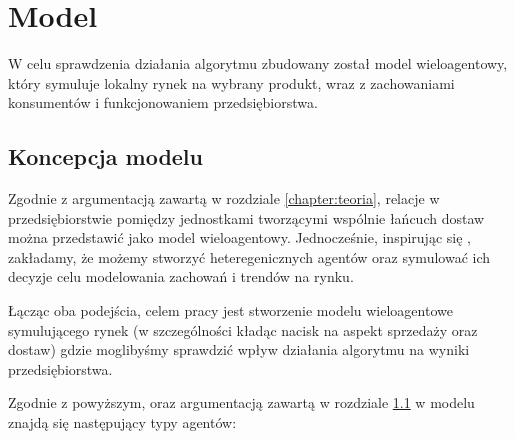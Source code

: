 \documentclass[polish, twoside, 12pt, a4paper]{article}
\theoremstyle{definition}
\theoremstyle{plain}
\theoremstyle{remark}
\begin{document}
\clearpage

\section{Model} \label{chapter:model}

W celu sprawdzenia działania algorytmu zbudowany został model wieloagentowy, który symuluje lokalny rynek na wybrany produkt, wraz z zachowaniami konsumentów i funkcjonowaniem przedsiębiorstwa.

\subsection{Koncepcja modelu} \label{chapter:koncepcja}

Zgodnie z argumentacją zawartą w rozdziale \ref{chapter:teoria}, relacje w przedsiębiorstwie pomiędzy jednostkami tworzącymi wspólnie łańcuch dostaw można przedstawić jako model wieloagentowy. Jednocześnie, inspirując się \cite{Kaminski2012}, zakładamy, że możemy stworzyć heteregenicznych agentów oraz symulować ich decyzje celu modelowania zachowań i trendów na rynku. 

Łącząc oba podejścia, celem pracy jest stworzenie modelu wieloagentowe symulującego rynek (w szczególności kładąc nacisk na aspekt sprzedaży oraz dostaw) gdzie moglibyśmy sprawdzić wpływ działania algorytmu na wyniki przedsiębiorstwa.

Zgodnie z powyższym, oraz argumentacją zawartą w rozdziale \ref{chapter:koncepcja} w modelu znajdą się następujący typy agentów: 
\end{document}
